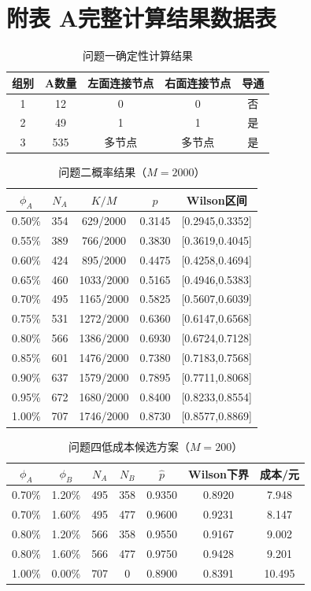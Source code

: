 \documentclass[12pt,a4paper,fontset=windows]{ctexart}
\begin{document}
\section*{附表 A\quad 完整计算结果数据表}

\begin{table}[H]\centering\caption{问题一确定性计算结果}\begin{tabular}{ccccc}\toprule 组别&A数量&左面连接节点&右面连接节点&导通\\\midrule 1&12&0&0&否\\2&49&1&1&是\\3&535&多节点&多节点&是\\\bottomrule\end{tabular}\end{table}

\begin{table}[H]\centering\caption{问题二概率结果（$M=2000$）}\begin{tabular}{ccccc}\toprule $\phi_A$&$N_A$&$K/M$&$\hat p$&Wilson区间\\\midrule 0.50\%&354&629/2000&0.3145&[0.2945,0.3352]\\0.55\%&389&766/2000&0.3830&[0.3619,0.4045]\\0.60\%&424&895/2000&0.4475&[0.4258,0.4694]\\0.65\%&460&1033/2000&0.5165&[0.4946,0.5383]\\0.70\%&495&1165/2000&0.5825&[0.5607,0.6039]\\0.75\%&531&1272/2000&0.6360&[0.6147,0.6568]\\0.80\%&566&1386/2000&0.6930&[0.6724,0.7128]\\0.85\%&601&1476/2000&0.7380&[0.7183,0.7568]\\0.90\%&637&1579/2000&0.7895&[0.7711,0.8068]\\0.95\%&672&1680/2000&0.8400&[0.8233,0.8554]\\1.00\%&707&1746/2000&0.8730&[0.8577,0.8869]\\\bottomrule\end{tabular}\end{table}

\begin{table}[H]\centering\caption{问题四低成本候选方案（$M=200$）}\begin{tabular}{ccccccc}\toprule $\phi_A$&$\phi_B$&$N_A$&$N_B$&$\hat p$&Wilson下界&成本/元\\\midrule 0.70\%&1.20\%&495&358&0.9350&0.8920&7.948\\0.70\%&1.60\%&495&477&0.9600&0.9231&8.147\\0.80\%&1.20\%&566&358&0.9550&0.9167&9.002\\0.80\%&1.60\%&566&477&0.9750&0.9428&9.201\\1.00\%&0.00\%&707&0&0.8900&0.8391&10.495\\\bottomrule\end{tabular}\end{table}
\end{document}

